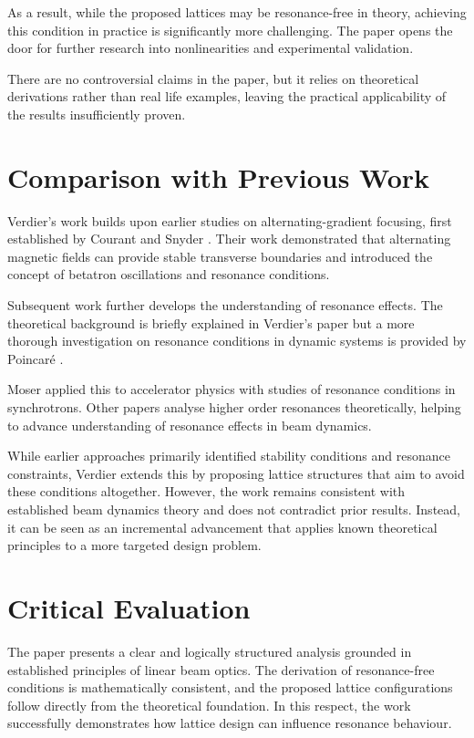 \documentclass[twocolumn,10pt,a4paper]{article}
\begin{document}
As a result, while the proposed lattices may be resonance-free in theory, achieving this condition in practice is significantly more challenging. The paper opens the door for further research into nonlinearities and experimental validation.

There are no controversial claims in the paper, but it relies on theoretical derivations rather than real life examples, leaving the practical applicability of the results insufficiently proven.

\section{Comparison with Previous Work}

Verdier's work builds upon earlier studies on alternating-gradient focusing, first established by Courant and Snyder \cite{courant1958}. Their work demonstrated that alternating magnetic fields can provide stable transverse boundaries and introduced the concept of betatron oscillations and resonance conditions.

Subsequent work further develops the understanding of resonance effects. The theoretical background is briefly explained in Verdier's paper but a more thorough investigation on resonance conditions in dynamic systems is provided by Poincaré \cite{poincare1892}.

Moser \cite{moser1956} applied this to accelerator physics with studies of resonance conditions in synchrotrons. Other papers \cite{guignard1978,todesco1996} analyse higher order resonances theoretically, helping to advance understanding of resonance effects in beam dynamics. 

While earlier approaches primarily identified stability conditions and resonance constraints, Verdier extends this by proposing lattice structures that aim to avoid these conditions altogether. However, the work remains consistent with established beam dynamics theory and does not contradict prior results. Instead, it can be seen as an incremental advancement that applies known theoretical principles to a more targeted design problem.

\section{Critical Evaluation}

The paper presents a clear and logically structured analysis grounded in established principles of linear beam optics. The derivation of resonance-free conditions is mathematically consistent, and the proposed lattice configurations follow directly from the theoretical foundation. In this respect, the work successfully demonstrates how lattice design can influence resonance behaviour.
\end{document}

